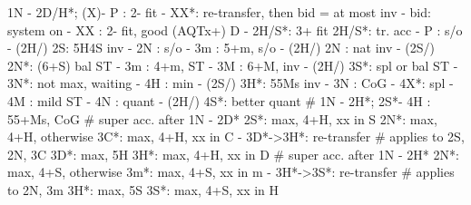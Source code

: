 1N - 2D/H*;
(X)- P  : 2- fit
        - XX*: re-transfer, then bid = at most inv
        - bid: system on
   - XX : 2- fit, good (AQTx+) D
   - 2H/S*: 3+ fit
2H/S*: tr. acc
     - P  : s/o
     - (2H/) 2S: 5H4S inv
          - 2N : s/o
              - 3m : 5+m, s/o
     - (2H/) 2N : nat inv
     - (2S/) 2N*: (6+S) bal ST
     - 3m : 4+m, ST
     - 3M : 6+M, inv
     - (2H/) 3S*: spl or bal ST
                - 3N*: not max, waiting
                - 4H : min
     - (2S/) 3H*: 55Ms inv
     - 3N : CoG
     - 4X*: spl
     - 4M : mild ST
     - 4N : quant
     - (2H/) 4S*: better quant
# 1N - 2H*; 2S*- 4H : 55+Ms, CoG
# super acc. after 1N - 2D*
2S*: max, 4+H, xx in S
2N*: max, 4+H, otherwise
3C*: max, 4+H, xx in C
   - 3D*->3H*: re-transfer  # applies to 2S, 2N, 3C
3D*: max, 5H
3H*: max, 4+H, xx in D
# super acc. after 1N - 2H*
2N*: max, 4+S, otherwise
3m*: max, 4+S, xx in m
   - 3H*->3S*: re-transfer  # applies to 2N, 3m
3H*: max, 5S
3S*: max, 4+S, xx in H

